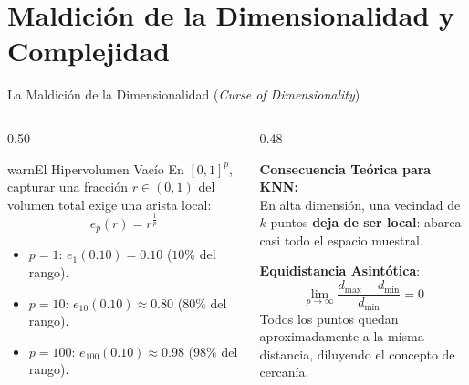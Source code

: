 \section{Maldición de la Dimensionalidad y Complejidad}

\begin{frame}{La Maldición de la Dimensionalidad (\textit{Curse of Dimensionality})}
\begin{columns}[T,onlytextwidth]
\begin{column}{0.50\textwidth}
\begin{contrastbox}{warn}{El Hipervolumen Vacío}
\scriptsize
En $[0, 1]^p$, capturar una fracción $r \in (0, 1)$ del volumen total exige una arista local:
\[
e_p(r) = r^{\frac{1}{p}}
\]
\begin{itemize}\setlength{\itemsep}{0.05em}
  \item $p = 1$: $e_1(0.10) = 0.10$ ($10\%$ del rango).
  \item $p = 10$: $e_{10}(0.10) \approx 0.80$ ($80\%$ del rango).
  \item $p = 100$: $e_{100}(0.10) \approx 0.98$ ($98\%$ del rango).
\end{itemize}
\end{contrastbox}
\end{column}

\begin{column}{0.48\textwidth}
\begin{ccdebox}
\scriptsize
\textbf{Consecuencia Teórica para KNN:}\\[0.05cm]
En alta dimensión, una vecindad de $k$ puntos \textbf{deja de ser local}: abarca casi todo el espacio muestral.
\end{ccdebox}

\vspace{0.06cm}
\begin{keybox}
\scriptsize
\textbf{Equidistancia Asintótica}:
\[
\lim_{p \to \infty} \frac{d_{\max} - d_{\min}}{d_{\min}} = 0
\]
Todos los puntos quedan aproximadamente a la misma distancia, diluyendo el concepto de cercanía.
\end{keybox}
\end{column}
\end{columns}
\end{frame}

